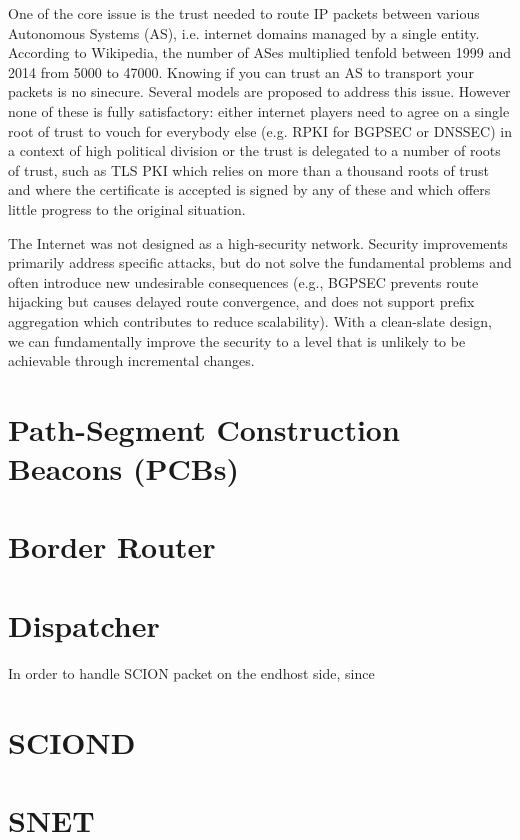 One of the core issue is the trust needed to route IP packets between various Autonomous Systems (AS), i.e. internet domains managed by a single entity. According to Wikipedia, the number of ASes multiplied tenfold between 1999 and 2014 from 5000 to 47000. Knowing if you can trust an AS to transport your packets is no sinecure. Several models are proposed to address this issue. However none of these is fully satisfactory: either internet players need to agree on a single root of trust to vouch for everybody else (e.g. RPKI for BGPSEC or DNSSEC) in a context of high political division or the trust is delegated to a number of roots of trust, such as TLS PKI which relies on more than a thousand roots of trust and where the certificate is accepted is signed by any of these and which offers little progress to the original situation.

The Internet was not designed as a high-security network. Security improvements primarily address specific attacks, but do not solve the fundamental problems and often introduce new undesirable consequences (e.g., BGPSEC prevents route hijacking but causes delayed route convergence, and does not support prefix aggregation which contributes to reduce scalability). With a clean-slate design, we can fundamentally improve the security to a level that is unlikely to be achievable through incremental changes.

\section{Path-Segment Construction Beacons (PCBs)}

\section{Border Router}

\section{Dispatcher}
In order to handle SCION packet on the endhost side, since

\section{SCIOND}

\section{SNET}

